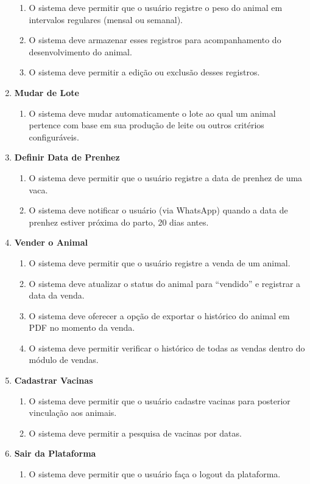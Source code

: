 \documentclass[12pt, a4paper]{article}
\begin{document}
\begin{spacing}{1.5}
\begin{spacing}{1.5}
\begin{enumerate}[label=RF0\arabic{*}.]
    \begin{enumerate}[label=RF05.0\arabic{*}]
        \item O sistema deve permitir que o usuário registre o peso do animal em intervalos regulares (mensal ou semanal).
        \item O sistema deve armazenar esses registros para acompanhamento do desenvolvimento do animal.
        \item O sistema deve permitir a edição ou exclusão desses registros.
    \end{enumerate}
    \item \textbf{Mudar de Lote}
    \begin{enumerate}[label=RF06.0\arabic{*}]
        \item O sistema deve mudar automaticamente o lote ao qual um animal pertence com base em sua produção de leite ou outros critérios configuráveis.
    \end{enumerate}
    \item \textbf{Definir Data de Prenhez}
    \begin{enumerate}[label=RF07.0\arabic{*}]
        \item O sistema deve permitir que o usuário registre a data de prenhez de uma vaca.
        \item O sistema deve notificar o usuário (via WhatsApp) quando a data de prenhez estiver próxima do parto, 20 dias antes.
    \end{enumerate}
    \item \textbf{Vender o Animal}
    \begin{enumerate}[label=RF8.0\arabic{*}]
        \item O sistema deve permitir que o usuário registre a venda de um animal.
        \item O sistema deve atualizar o status do animal para ``vendido'' e registrar a data da venda.
        \item O sistema deve oferecer a opção de exportar o histórico do animal em PDF no momento da venda.
        \item O sistema deve permitir verificar o histórico de todas as vendas dentro do módulo de vendas.
    \end{enumerate}
    \item \textbf{Cadastrar Vacinas}
    \begin{enumerate}[label=RF9.0\arabic{*}]
        \item O sistema deve permitir que o usuário cadastre vacinas para posterior vinculação aos animais.
        \item O sistema deve permitir a pesquisa de vacinas por datas.
    \end{enumerate}
    \item \textbf{Sair da Plataforma}
    \begin{enumerate}[label=RF10.0\arabic{*}]
        \item O sistema deve permitir que o usuário faça o logout da plataforma.
    \end{enumerate}
\end{enumerate}
\end{spacing}


\end{spacing}
\end{document}
